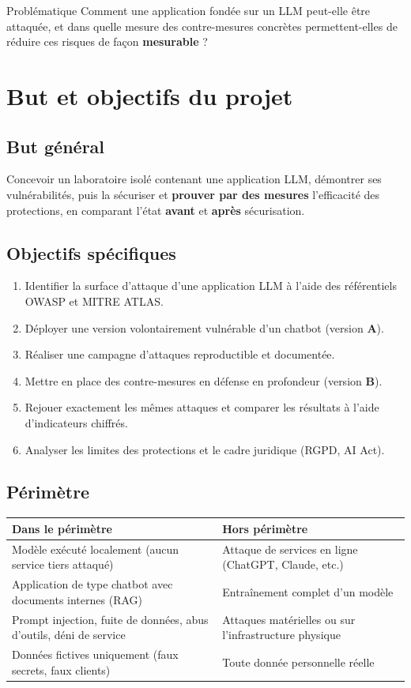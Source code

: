 \documentclass[11pt,a4paper]{article}
\begin{document}
\begin{boiteinfo}{Problématique}
Comment une application fondée sur un LLM peut-elle être attaquée, et dans quelle mesure des contre-mesures concrètes permettent-elles de réduire ces risques de façon \textbf{mesurable} ?
\end{boiteinfo}

\section{But et objectifs du projet}

\subsection{But général}
Concevoir un laboratoire isolé contenant une application LLM, démontrer ses vulnérabilités, puis la sécuriser et \textbf{prouver par des mesures} l'efficacité des protections, en comparant l'état \textbf{avant} et \textbf{après} sécurisation.

\subsection{Objectifs spécifiques}
\begin{enumerate}
  \item Identifier la surface d'attaque d'une application LLM à l'aide des référentiels OWASP et MITRE ATLAS.
  \item Déployer une version volontairement vulnérable d'un chatbot (version \textbf{A}).
  \item Réaliser une campagne d'attaques reproductible et documentée.
  \item Mettre en place des contre-mesures en défense en profondeur (version \textbf{B}).
  \item Rejouer exactement les mêmes attaques et comparer les résultats à l'aide d'indicateurs chiffrés.
  \item Analyser les limites des protections et le cadre juridique (RGPD, AI Act).
\end{enumerate}

\subsection{Périmètre}
\begin{tabularx}{\linewidth}{@{}YY@{}}
\toprule
\textbf{Dans le périmètre} & \textbf{Hors périmètre} \\
\midrule
Modèle exécuté localement (aucun service tiers attaqué) &
Attaque de services en ligne (ChatGPT, Claude, etc.) \\
Application de type chatbot avec documents internes (RAG) &
Entraînement complet d'un modèle \\
Prompt injection, fuite de données, abus d'outils, déni de service &
Attaques matérielles ou sur l'infrastructure physique \\
Données fictives uniquement (faux secrets, faux clients) &
Toute donnée personnelle réelle \\
\bottomrule
\end{tabularx}
\end{document}
